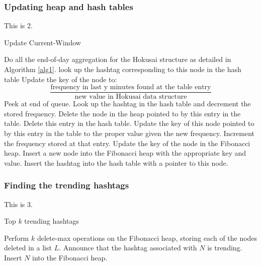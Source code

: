 \documentclass[twoside]{article}
\begin{document}
\subsubsection{Updating heap and hash tables}

This is 2.

\begin{algorithm}
\caption{Update Current-Window}\label{alg2}
\begin{algorithmic}[1]
		\State Do all the end-of-day aggregation for the Hokusai structure as detailed in Algorithm \ref{alg1}.
			\State look up the hashtag corresponding to this node in the hash table
			\State Update the key of the node to: \[\frac{\text{frequency in last y minutes found at the table entry}}{\text{new value in Hokusai data structure}}\]
		\EndFor
	\EndIf
		\State Peek at end of queue.
			\State Look up the hashtag in the hash table and decrement the stored frequency.
				\State Delete the node in the heap pointed to by this entry in the table.
				\State Delete this entry in the hash table.
			\Else	
				\State Update the key of this node pointed to by this entry in the table to the proper value given the new frequency.
			\EndIf
		\EndIf
	\EndIf
		\State Increment the frequency stored at that entry.
		\State Update the key of the node in the Fibonacci heap.
	\Else
		\State Insert a new node into the Fibonacci heap with the appropriate key and value. 
		\State Insert the hashtag into the hash table with a pointer to this node.
 	\EndIf
\EndWhile
\end{algorithmic}
\end{algorithm}

\subsubsection{Finding the trending hashtags}

This is 3.

\begin{algorithm}
\caption{Top $k$ trending hashtags} \label{alg3}
\begin{algorithmic}[1]
\State Perform $k$ delete-max operations on the Fibonacci heap, storing each of the nodes deleted in a list $L$.
	\State Announce that the hashtag associated with $N$ is trending.
	\State Insert $N$ into the Fibonacci heap.
\EndFor
\end{algorithmic}
\end{algorithm}
\end{document}
